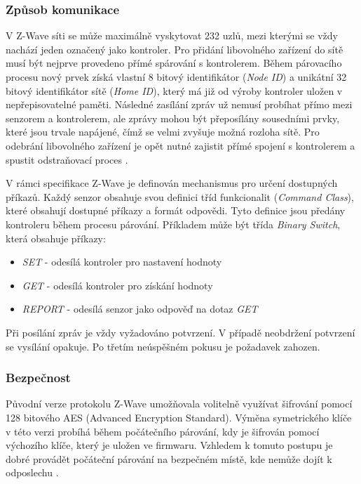  \subsubsection{Způsob komunikace}
 V Z-Wave síti se může maximálně vyskytovat 232 uzlů, mezi kterými se vždy nachází jeden označený
 jako kontroler. Pro přidání libovolného zařízení do sítě musí být nejprve provedeno přímé spárování
 s kontrolerem. Během párovacího procesu nový prvek získá vlastní 8 bitový identifikátor (\textit{Node ID}) a 
 unikátní 32 bitový identifikátor sítě (\textit{Home ID}), který má již od výroby kontroler uložen v nepřepisovatelné paměti.
 Následné zasílání zpráv už nemusí probíhat přímo mezi senzorem a kontrolerem, ale zprávy mohou
 být přeposílány sousedními prvky, které jsou trvale napájené, čímž se velmi zvyšuje možná rozloha sítě. 
 Pro odebrání libovolného zařízení je opět nutné zajistit přímé spojení s kontrolerem a spustit odstraňovací
 proces \cite{cesnet-survey}.
 
 V rámci specifikace Z-Wave \cite{zwave-spec} je definován mechanismus pro určení dostupných příkazů. Každý senzor obsahuje
 svou definici tříd funkcionalit (\textit{Command Class}), které obsahují dostupné příkazy a formát odpovědi. Tyto definice
 jsou předány kontroleru během procesu párování. Příkladem může být třída \textit{Binary Switch}, která obsahuje příkazy:
 \begin{itemize}
 \item \textit{SET} - odesílá kontroler pro nastavení hodnoty 
 \item \textit{GET} - odesílá kontroler pro získání hodnoty  
 \item \textit{REPORT} - odesílá senzor jako odpověď na dotaz \textit{GET} 
 \end{itemize} 
 
 Při posílání zpráv je vždy vyžadováno potvrzení. V případě neobdržení potvrzení se vysílání opakuje. 
 Po třetím neúspěšném pokusu je požadavek zahozen.
 
 \subsubsection{Bezpečnost}
 Původní verze protokolu Z-Wave umožňovala volitelně využívat šifrování pomocí 128 bitového AES (Advanced Encryption Standard).
 Výměna symetrického klíče v této verzi probíhá během počátečního párování, kdy je šifrován pomocí
 výchozího
 klíče, který je uložen ve firmwaru. Vzhledem k tomuto postupu je dobré provádět počáteční párování na bezpečném
 místě, kde nemůže dojít k odposlechu \cite{zwave-S0-attack}.
 
